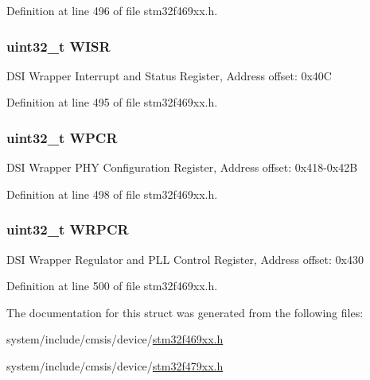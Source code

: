Definition at line 496 of file stm32f469xx.\+h.

\subsubsection[{\texorpdfstring{W\+I\+SR}{WISR}}]{ uint32\+\_\+t W\+I\+SR}\hypertarget{struct_d_s_i___type_def_a5ae1f4ac0e821b4d9f945e1b9d7aeccc}{}\label{struct_d_s_i___type_def_a5ae1f4ac0e821b4d9f945e1b9d7aeccc}
D\+SI Wrapper Interrupt and Status Register, Address offset\+: 0x40C 

Definition at line 495 of file stm32f469xx.\+h.

\subsubsection[{\texorpdfstring{W\+P\+CR}{WPCR}}]{ uint32\+\_\+t W\+P\+CR}\hypertarget{struct_d_s_i___type_def_af13e333411bfc7c44433b91f22091e49}{}\label{struct_d_s_i___type_def_af13e333411bfc7c44433b91f22091e49}
D\+SI Wrapper P\+HY Configuration Register, Address offset\+: 0x418-\/0x42B 

Definition at line 498 of file stm32f469xx.\+h.

\subsubsection[{\texorpdfstring{W\+R\+P\+CR}{WRPCR}}]{ uint32\+\_\+t W\+R\+P\+CR}\hypertarget{struct_d_s_i___type_def_a5eb6c6db929319dddfbb044e546f4d93}{}\label{struct_d_s_i___type_def_a5eb6c6db929319dddfbb044e546f4d93}
D\+SI Wrapper Regulator and P\+LL Control Register, Address offset\+: 0x430 

Definition at line 500 of file stm32f469xx.\+h.



The documentation for this struct was generated from the following files\+:\begin{DoxyCompactItemize}
\item 
system/include/cmsis/device/\hyperlink{stm32f469xx_8h}{stm32f469xx.\+h}\item 
system/include/cmsis/device/\hyperlink{stm32f479xx_8h}{stm32f479xx.\+h}\end{DoxyCompactItemize}
